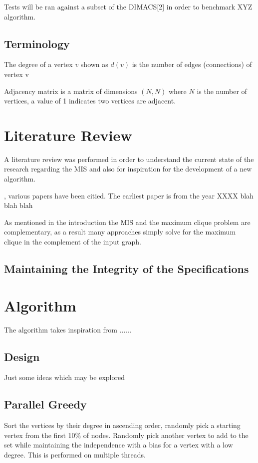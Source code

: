 \documentclass[conference]{IEEEtran}
\begin{document}
Tests will be ran against a subset of the DIMACS[2] in order to benchmark XYZ algorithm.

\subsection{Terminology}

The degree of a vertex $v$ shown as $d(v)$ is the number of edges (connections) of vertex v

Adjacency matrix is a matrix of dimensions $(N, N)$ where $N$ is the number of vertices, a value of 1 indicates two
vertices are adjacent.

\section{Literature Review}
A literature review was performed in order to understand the current state of the research regarding the MIS and also
for inspiration for the development of a new algorithm.


, various papers have been citied. The earliest paper is from the year XXXX
blah blah blah

As mentioned in the introduction the MIS and the maximum clique problem are complementary, as a result many approaches
simply solve for the maximum clique in the complement of the input graph.


\subsection{Maintaining the Integrity of the Specifications}

\section{Algorithm}

The algorithm takes inspiration from ......

\subsection{Design}

Just some ideas which may be explored

\subsection{Parallel Greedy}

Sort the vertices by their degree in ascending order, randomly pick a starting vertex from the first 10\% of nodes. 
Randomly pick another vertex to add to the set while maintaining the independence with a bias for a vertex with a low 
degree. This is performed on multiple threads.
\end{document}
